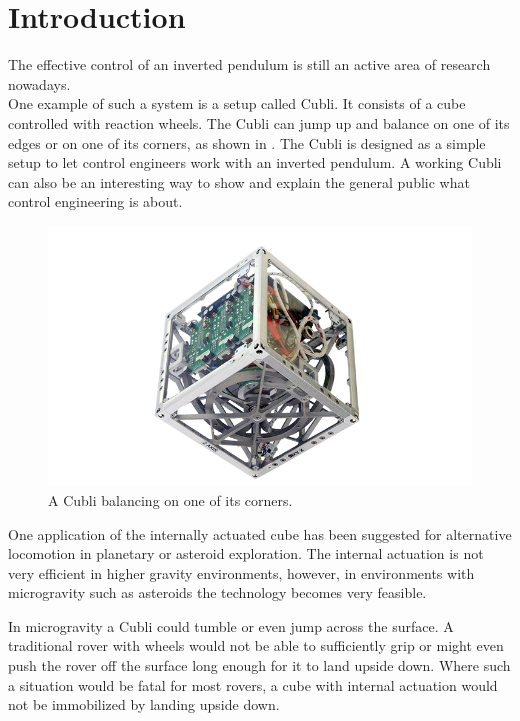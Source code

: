 \chapter{Introduction}\label{introduction}
The effective control of an inverted pendulum is still an active area of research nowadays.\cite{JHuber}\\
One example of such a system is a setup called Cubli. It consists of a cube controlled with reaction wheels. The Cubli can jump up and balance on one of its edges or on one of its corners, as shown in .
The Cubli is designed as a simple setup to let control engineers work with an inverted pendulum. A working Cubli can also be an interesting way to show and explain the general public  what control engineering is about.\cite{MGajamohan}
%
\begin{figure}[H] 
	\centering
	\includegraphics[scale=1.3]{figures/CubliCorner-700x4302}
	\caption{A Cubli balancing on one of its corners.\cite{RAndrea}}
	\label{CubliCorner}
\end{figure}
%
One application of the internally actuated cube has been suggested for alternative locomotion in planetary or asteroid exploration. The internal actuation is not very efficient in higher gravity environments, however, in environments with microgravity such as asteroids the technology becomes very feasible.\cite{RAllen}

In microgravity a Cubli could tumble or even jump across the surface. A traditional rover with wheels would not be able to sufficiently grip or might even push the rover off the surface long enough for it to land upside down. Where such a situation would be fatal for most rovers, a cube with internal actuation would not be immobilized by landing upside down.\cite{ELandau}

